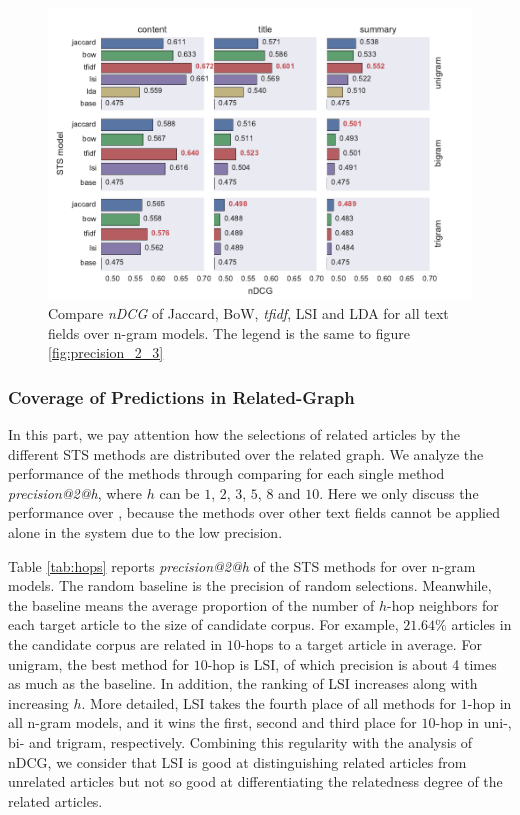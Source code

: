 \begin{figure}[!htb]
    \centering
    \includegraphics[width=\textwidth]{fig/ndcg}
    \caption[Compare \textit{nDCG} of Jaccard, BoW, \textit{tfidf}, LSI and LDA for all text fields over n-gram models]{Compare \textit{nDCG} of Jaccard, BoW, \textit{tfidf}, LSI and LDA for all text fields over n-gram models. The legend is the same to figure \ref{fig:precision_2_3}}
    \label{fig:ndcg}
\end{figure}

\subsubsection{Coverage of Predictions in Related-Graph}

In this part, we pay attention how the selections of related articles by the different STS methods are distributed over the related graph. We analyze the performance of the methods through comparing for each single method \textit{precision@2@h}, where $h$ can be $1$, $2$, $3$, $5$, $8$ and $10$. Here we only discuss the performance over \icontent{}, because the methods over other text fields cannot be applied alone in the system due to the low precision. 

Table \ref{tab:hops} reports \textit{precision@2@h} of the STS methods for \icontent{} over n-gram models. The random baseline is the precision of random selections. Meanwhile, the baseline means the average proportion of the number of $h$-hop neighbors for each target article to the size of candidate corpus. For example, $21.64\%$ articles in the candidate corpus are related in $10$-hops to a target article in average. For unigram, the best method for $10$-hop is LSI, of which precision is about 4 times as much as the baseline. In addition, the ranking of LSI increases along with increasing $h$. More detailed, LSI takes the fourth place of all methods for $1$-hop in all n-gram models, and it wins the first, second and third place for $10$-hop in uni-, bi- and trigram, respectively. Combining this regularity with the analysis of nDCG, we consider that LSI is good at distinguishing related articles from unrelated articles but not so good at differentiating the relatedness degree of the related articles. 


